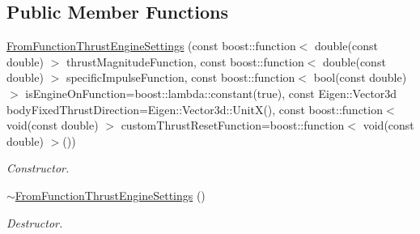 \subsection*{Public Member Functions}
\begin{DoxyCompactItemize}
\item 
\hyperlink{classtudat_1_1simulation__setup_1_1FromFunctionThrustEngineSettings_a08f1f93d3054fe6124d55a832695be5a}{From\+Function\+Thrust\+Engine\+Settings} (const boost\+::function$<$ double(const double) $>$ thrust\+Magnitude\+Function, const boost\+::function$<$ double(const double) $>$ specific\+Impulse\+Function, const boost\+::function$<$ bool(const double) $>$ is\+Engine\+On\+Function=boost\+::lambda\+::constant(true), const Eigen\+::\+Vector3d body\+Fixed\+Thrust\+Direction=Eigen\+::\+Vector3d\+::\+UnitX(), const boost\+::function$<$ void(const double) $>$ custom\+Thrust\+Reset\+Function=boost\+::function$<$ void(const double) $>$())
\begin{DoxyCompactList}\small\item\em Constructor. \end{DoxyCompactList}\item 
\hyperlink{classtudat_1_1simulation__setup_1_1FromFunctionThrustEngineSettings_aea55f4c0a0e9ad2c58b9201036a98e14}{$\sim$\+From\+Function\+Thrust\+Engine\+Settings} ()\hypertarget{classtudat_1_1simulation__setup_1_1FromFunctionThrustEngineSettings_aea55f4c0a0e9ad2c58b9201036a98e14}{}\label{classtudat_1_1simulation__setup_1_1FromFunctionThrustEngineSettings_aea55f4c0a0e9ad2c58b9201036a98e14}

\begin{DoxyCompactList}\small\item\em Destructor. \end{DoxyCompactList}\end{DoxyCompactItemize}
